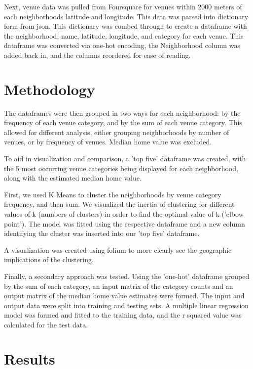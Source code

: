 \documentclass[twoside,14pt]{report}
\begin{document}
Next, venue data was pulled from Foursquare for venues within 2000 meters of each neighborhoods latitude and longitude.  This data was parsed into dictionary form from json.  This dictionary was combed through to create a dataframe with the neighborhood, name, latitude, longitude, and category for each venue.  This dataframe was converted via one-hot encoding, the Neighborhood column was added back in, and the columns reordered for ease of reading. 

\chapter*{Methodology}

The dataframes were then grouped in two ways for each neighborhood: by the frequency of each venue category, and by the sum of each venue category.  This allowed for different analysis, either grouping neighborhoods by number of venues, or by frequency of venues.  Median home value was excluded.

To aid in visualization and comparison, a 'top five' dataframe was created, with the 5 most occurring venue categories being displayed for each neighborhood, along with the estimated median home value.

First, we used K Means to cluster the neighborhoods by venue category frequency, and then sum.  We visualized the inertia of clustering for different values of k (numbers of clusters) in order to find the optimal value of k ('elbow point').  The model was fitted using the respective dataframe and a new column identifying the cluster was inserted into our 'top five' dataframe.  

A visualization was created using folium to more clearly see the geographic implications of the clustering.

Finally, a secondary approach was tested.  Using the 'one-hot' dataframe grouped by the sum of each category, an input matrix of the category counts and an output matrix of the median home value estimates were formed.  The input and output data were split into training and testing sets.  A multiple linear regression model was formed and fitted to the training data, and the r squared value was calculated for the test data.  


\chapter*{Results}
\end{document}
